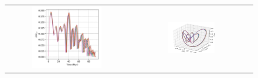 \documentclass{beamer}
\begin{document}
\begin{frame}{}
	\begin{figure}[h]
		\begin{tabular}{cc}
			\includegraphics[width = 0.6\textwidth]{"../Files/Week 11/lyapunov_distances"} &
			\includegraphics[width = 0.4\textwidth]{"../Files/Week 11/lyapunov_orbits"}
		\end{tabular}
	\end{figure}
\end{frame}

\end{document}
